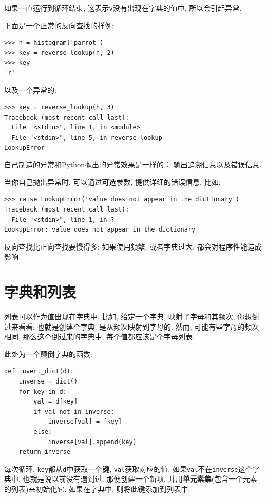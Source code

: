 \documentclass[10pt]{book}
\begin{document}
如果一直运行到循环结束, 这表示{\tt v}没有出现在字典的值中, 
所以会引起异常. 

下面是一个正常的反向查找的样例:

\begin{verbatim}
>>> h = histogram('parrot')
>>> key = reverse_lookup(h, 2)
>>> key
'r'
\end{verbatim}
%
以及一个异常的:

\begin{verbatim}
>>> key = reverse_lookup(h, 3)
Traceback (most recent call last):
  File "<stdin>", line 1, in <module>
  File "<stdin>", line 5, in reverse_lookup
LookupError
\end{verbatim}
%
自己制造的异常和Python抛出的异常效果是一样的：
输出追溯信息以及错误信息. 

当你自己抛出异常时, 可以通过可选参数, 提供详细的错误信息. 比如:

\begin{verbatim}
>>> raise LookupError('value does not appear in the dictionary')
Traceback (most recent call last):
  File "<stdin>", line 1, in ?
LookupError: value does not appear in the dictionary
\end{verbatim}
%
反向查找比正向查找要慢得多;
如果使用频繁, 或者字典过大, 都会对程序性能造成影响. 


\section{字典和列表}
\label{invert}

列表可以作为值出现在字典中. 比如, 给定一个字典, 映射了字母和其频次, 
你想倒过来看看; 也就是创建个字典, 是从频次映射到字母的. 
然而, 可能有些字母的频次相同, 那么这个倒过来的字典中, 每个值都应该是个字母列表. 

此处为一个颠倒字典的函数:

\begin{verbatim}
def invert_dict(d):
    inverse = dict()
    for key in d:
        val = d[key]
        if val not in inverse:
            inverse[val] = [key]
        else:
            inverse[val].append(key)
    return inverse
\end{verbatim}
%
每次循环, {\tt key}都从{\tt d}中获取一个键, {\tt val}获取对应的值. 
如果{\tt val}不在{\tt inverse}这个字典中, 也就是说以前没有遇到过, 
那便创建一个新项, 并用{\bf 单元素集}(包含一个元素的列表)来初始化它. 
如果在字典中, 则将此键添加到列表中. 
\end{document}
